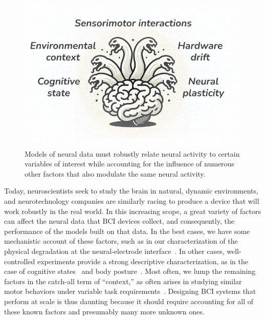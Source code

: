 \documentclass[12pt,oneside]{report}
\begin{document}
\begin{figure}[h]
  \centering
  \includegraphics[width=0.9\linewidth]{ch1_hydra.png}
  \caption{Models of neural data must robustly relate neural activity to certain variables of interest while accounting for the influence of numerous other factors that also modulate the same neural activity.}
  \label{fig:hydra}
\end{figure}

Today, neuroscientists seek to study the brain in natural, dynamic environments, and neurotechnology companies are similarly racing to produce a device that will work robustly in the real world.
In this increasing scope, a great variety of factors can affect the neural data that BCI devices collect, and consequently, the performance of the models built on that data. In the best cases, we have some mechanistic account of these factors, such as in our characterization of the physical degradation at the neural-electrode interface~\citep{pandarinath_22_review,bjaanes2024quantifying}. In other cases, well-controlled experiments provide a strong descriptive characterization, as in the case of cognitive states~\citep{cowley2020slow,smoulder2024neural} and body posture~\citep{marino2024posture}. Most often, we lump the remaining factors in the catch-all term of ``context,'' as often arises in studying similar motor behaviors under variable task requirements~\citep{mender23ctx,ma2021ctx,downey2017object}. Designing BCI systems that perform at scale is thus daunting because it should require accounting for all of these known factors and presumably many more unknown ones.
\end{document}
